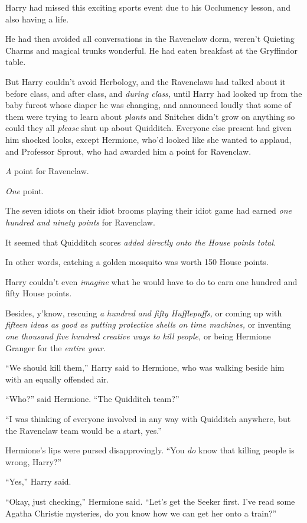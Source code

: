 Harry had missed this exciting sports event due to his Occlumency
lesson, and also having a life.

He had then avoided all conversations in the Ravenclaw dorm, weren't
Quieting Charms and magical trunks wonderful. He had eaten breakfast at
the Gryffindor table.

But Harry couldn't avoid Herbology, and the Ravenclaws had talked about
it before class, and after class, and \emph{during class,} until Harry
had looked up from the baby furcot whose diaper he was changing, and
announced loudly that some of them were trying to learn about
\emph{plants} and Snitches didn't grow on anything so could they all
\emph{please} shut up about Quidditch. Everyone else present had given
him shocked looks, except Hermione, who'd looked like she wanted to
applaud, and Professor Sprout, who had awarded him a point for
Ravenclaw.

\emph{A} point for Ravenclaw.

\emph{One} point.

The seven idiots on their idiot brooms playing their idiot game had
earned \emph{one hundred and ninety points} for Ravenclaw.

It seemed that Quidditch scores \emph{added directly onto the House
points total.}

In other words, catching a golden mosquito was worth 150 House points.

Harry couldn't even \emph{imagine} what he would have to do to earn one
hundred and fifty House points.

Besides, y'know, rescuing \emph{a hundred and fifty Hufflepuffs,} or
coming up with \emph{fifteen ideas as good as putting protective shells
on time machines,} or inventing \emph{one thousand five hundred creative
ways to kill people,} or being Hermione Granger for the \emph{entire
year}.

``We should kill them,'' Harry said to Hermione, who was walking beside
him with an equally offended air.

``Who?'' said Hermione. ``The Quidditch team?''

``I was thinking of everyone involved in any way with Quidditch
anywhere, but the Ravenclaw team would be a start, yes.''

Hermione's lips were pursed disapprovingly. ``You \emph{do} know that
killing people is wrong, Harry?''

``Yes,'' Harry said.

``Okay, just checking,'' Hermione said. ``Let's get the Seeker first.
I've read some Agatha Christie mysteries, do you know how we can get her
onto a train?''

